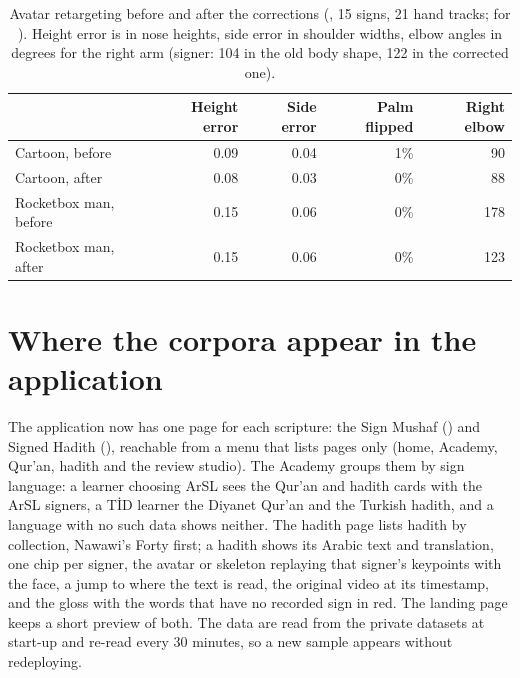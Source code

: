 \begin{table}[ht]
\centering
\small
\caption{Avatar retargeting before and after the corrections (, 15 signs, 21
hand tracks;  for ). Height error is in nose heights, side error in shoulder widths, elbow
angles in degrees for the right arm (signer: 104\textdegree{} in the old body shape, 122\textdegree{} in the corrected one).}
\label{tab:retarget_realistic}
\begin{tabular}{lrrrr}
\toprule
& Height error & Side error & Palm flipped & Right elbow \\
\midrule
Cartoon, before & 0.09 & 0.04 & 1\% & 90 \\
Cartoon, after & 0.08 & 0.03 & 0\% & 88 \\
Rocketbox man, before & 0.15 & 0.06 & 0\% & 178 \\
Rocketbox man, after & 0.15 & 0.06 & 0\% & 123 \\
\bottomrule
\end{tabular}
\end{table}

\section{Where the corpora appear in the application}
\label{sec:scripture_app}
The application now has one page for each scripture: the Sign Mushaf () and Signed Hadith
(), reachable from a menu that lists pages only (home, Academy, Qur'an, hadith and the review studio).
The Academy groups them by sign language: a learner choosing ArSL sees the Qur'an and hadith cards with the ArSL
signers, a T\.{I}D learner the Diyanet Qur'an and the Turkish hadith, and a language with no such data shows neither.
The hadith page lists hadith by collection, Nawawi's Forty first; a hadith shows its Arabic text and translation, one
chip per signer, the avatar or skeleton replaying that signer's keypoints with the face, a jump to where the text is
read, the original video at its timestamp, and the gloss with the words that have no recorded sign in red. The landing
page keeps a short preview of both. The data are read from the private datasets at start-up and re-read every 30
minutes, so a new sample appears without redeploying.

